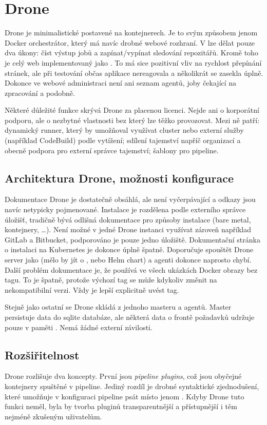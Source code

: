 \section{Drone}
    Drone je minimalistické \CI postavené na kontejnerech. Je to svým způsobem jenom Docker orchestrátor, který má navíc drobné webové rozhraní. V  lze dělat pouze dva úkony: číst výstup jobů a zapínat/vypínat sledování repozitářů. Kromě toho je celý web implementovaný jako . To má sice pozitivní vliv na rychlost přepínání stránek, ale při testování občas aplikace nereagovala a několikrát se zasekla úplně. Dokonce ve webové administraci není ani seznam agentů, joby čekající na zpracování a podobně.

    Některé důležité funkce skrývá Drone za placenou licenci. Nejde ani o korporátní podporu, ale o nezbytné vlastnosti bez který lze \CI těžko provozovat. Mezi ně patří: dynamický runner, který by umožňoval využívat cluster nebo externí služby (například  CodeBuild) podle vytížení; sdílení tajemství napříč organizací a obecně podpora pro externí správce tajemství; šablony pro pipeline.

    \subsection{Architektura Drone, možnosti konfigurace}
        Dokumentace Drone je dostatečně obsáhlá, ale není vyčerpávající a odkazy jsou navíc netypicky pojmenované. Instalace je rozdělena podle externího správce úložišť, tradičně bývá odlišná dokumentace pro způsoby instalace (bare metal, kontejnery, \ldots). Není možné v jedné Drone instanci využívat zároveň například GitLab a Bitbucket, podporováno je pouze jedno úložiště. Dokumentační stránka o instalaci na Kubernetes je dokonce úplně špatně. Doporučuje spouštět Drone server jako  (mělo by jít o , nebo Helm chart) a agenti dokonce naprosto chybí. Další problém dokumentace je, že používá ve všech ukázkách Docker obrazy bez tagu. To je špatně, protože výchozí tag  se může kdykoliv změnit na nekompatibilní verzi. Vždy je lepší explicitně uvést tag.

        Stejně jako ostatní \CI se Drone skládá z jednoho masteru a agentů. Master persistuje data do sqlite databáze, ale některá data o frontě požadavků udržuje pouze v paměti \cite{drone-ha}. Nemá žádné externí závilosti.

    \subsection{Rozšiřitelnost}
        Drone rozlišuje dva koncepty. První jsou \textit{pipeline plugins}, což jsou obyčejné kontejnery spuštěné v pipeline. Jediný rozdíl je drobné syntaktické zjednodušení, které umožňuje v konfiguraci pipeline psát místo  jenom . Kdyby Drone tuto funkci neměl, byla by tvorba pluginů transparentnější a přístupnější i těm nejméně zkušeným uživatelům.


